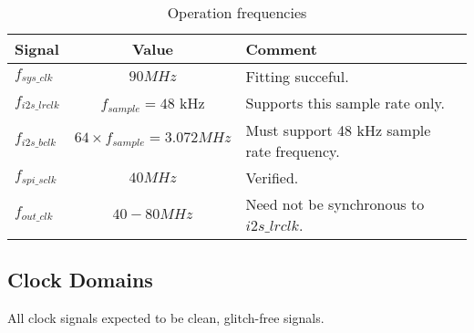 \documentclass{ug}
\theoremstyle{plain}
\begin{document}
\begin{table}[H]
  \begin{center}
    \begin{tabular}{|l|c|l|}
      \hline

      \rowcolor{iob-green}
      \textbf{Signal}  & \textbf{Value} & \textbf{Comment}\\
      \hline
      \hline

      $f_{sys\_clk}$ & $ 90 MHz$ & Fitting succeful.\\
      \hline

      \rowcolor{iob-blue}
      $f_{i2s\_lrclk}$ & $f_{sample}=48$ kHz & Supports this sample rate only.\\
      \hline

      $f_{i2s\_bclk}$ & $64 \times f_{sample}=3.072 MHz$ & Must support 48 kHz sample rate frequency. \\
      \hline

      \rowcolor{iob-blue}
      $f_{spi\_sclk}$ & $40 MHz$ & Verified.\\
      \hline

      $f_{out\_clk}$ & $40-80 MHz$ & Need not be synchronous to  $i2s\_lrclk$.\\
      \hline
      
    \end{tabular}
    \caption{Operation frequencies}
    \label{tab:freq}
  \end{center}
\end{table}



\subsection{Clock Domains}
\label{sec:cdc}

All clock signals expected to be clean, glitch-free signals.
\end{document}
